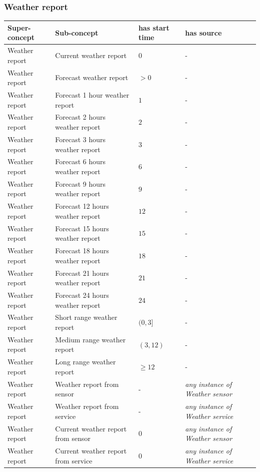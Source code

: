 \subsubsection{Weather report}

\begin{longtable}{|p{}|p{}|p{}|p{}|}
  \hline
  \textbf{Super-concept} & \textbf{Sub-concept} & \textbf{has start time} & \textbf{has source} \\
  \hline\hline
  Weather report & Current weather report & $0$ & - \\
  \hline
  Weather report & Forecast weather report & $> 0$ & - \\
  \hline
  Weather report & Forecast 1 hour weather report & $1$ & - \\
  \hline
  Weather report & Forecast 2 hours weather report & $2$ & - \\
  \hline
  Weather report & Forecast 3 hours weather report & $3$ & - \\
  \hline
  Weather report & Forecast 6 hours weather report & $6$ & - \\
  \hline
  Weather report & Forecast 9 hours weather report & $9$ & - \\
  \hline
  Weather report & Forecast 12 hours weather report & $12$ & - \\
  \hline
  Weather report & Forecast 15 hours weather report & $15$ & - \\
  \hline
  Weather report & Forecast 18 hours weather report & $18$ & - \\
  \hline
  Weather report & Forecast 21 hours weather report & $21$ & - \\
  \hline
  Weather report & Forecast 24 hours weather report & $24$ & - \\
  \hline
  Weather report & Short range weather report & $(0, 3]$ & - \\
  \hline
  Weather report & Medium range weather report & $(3, 12)$ & - \\
  \hline
  Weather report & Long range weather report & $\geq 12$ & - \\
  \hline
  Weather report & Weather report from sensor & - & \emph{any instance of Weather sensor} \\
  \hline
  Weather report & Weather report from service & - & \emph{any instance of Weather service} \\
  \hline
  Weather report & Current weather report from sensor & $0$ & \emph{any instance of Weather sensor} \\
  \hline
  Weather report & Current weather report from service & $0$ & \emph{any instance of Weather service} \\
  \hline
\end{longtable}

